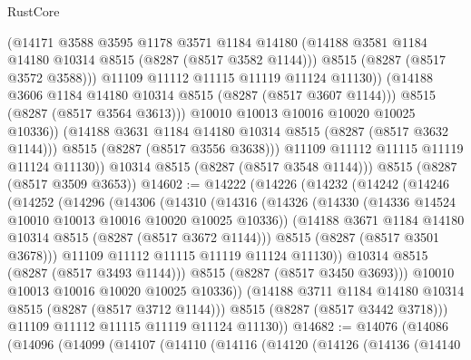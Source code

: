 \begin{lexlean}{RustCore}
\begin{coremodule}
                      (@14171
                        @3588
                        @3595
                        @1178
                        @3571
                        @1184
                        @14180
                        (@14188 @3581 @1184 @14180 @10314 @8515 (@8287 (@8517 @3582 @1144)))
                        @8515
                        (@8287 (@8517 @3572 @3588)))
                      @11109
                      @11112
                      @11115
                      @11119
                      @11124
                      @11130))
                  (@14188 @3606 @1184 @14180 @10314 @8515 (@8287 (@8517 @3607 @1144)))
                  @8515
                  (@8287 (@8517 @3564 @3613)))
                @10010
                @10013
                @10016
                @10020
                @10025
                @10336))
            (@14188 @3631 @1184 @14180 @10314 @8515 (@8287 (@8517 @3632 @1144)))
            @8515
            (@8287 (@8517 @3556 @3638)))
          @11109
          @11112
          @11115
          @11119
          @11124
          @11130))
      @10314
      @8515
      (@8287 (@8517 @3548 @1144)))
    @8515
    (@8287 (@8517 @3509 @3653))
@14602 := @14222
    (@14226
      (@14232
        (@14242
          (@14246
            (@14252
              (@14296
                (@14306
                  (@14310
                    (@14316
                      (@14326
                        (@14330 (@14336 @14524 @10010 @10013 @10016 @10020 @10025 @10336))
                        (@14188 @3671 @1184 @14180 @10314 @8515 (@8287 (@8517 @3672 @1144)))
                        @8515
                        (@8287 (@8517 @3501 @3678)))
                      @11109
                      @11112
                      @11115
                      @11119
                      @11124
                      @11130))
                  @10314
                  @8515
                  (@8287 (@8517 @3493 @1144)))
                @8515
                (@8287 (@8517 @3450 @3693)))
              @10010
              @10013
              @10016
              @10020
              @10025
              @10336))
          (@14188 @3711 @1184 @14180 @10314 @8515 (@8287 (@8517 @3712 @1144)))
          @8515
          (@8287 (@8517 @3442 @3718)))
        @11109
        @11112
        @11115
        @11119
        @11124
        @11130))
@14682 := @14076
    (@14086
      (@14096
        (@14099
          (@14107
            (@14110
              (@14116
                (@14120
                  (@14126
                    (@14136
                      (@14140

\end{coremodule}
\end{lexlean}
